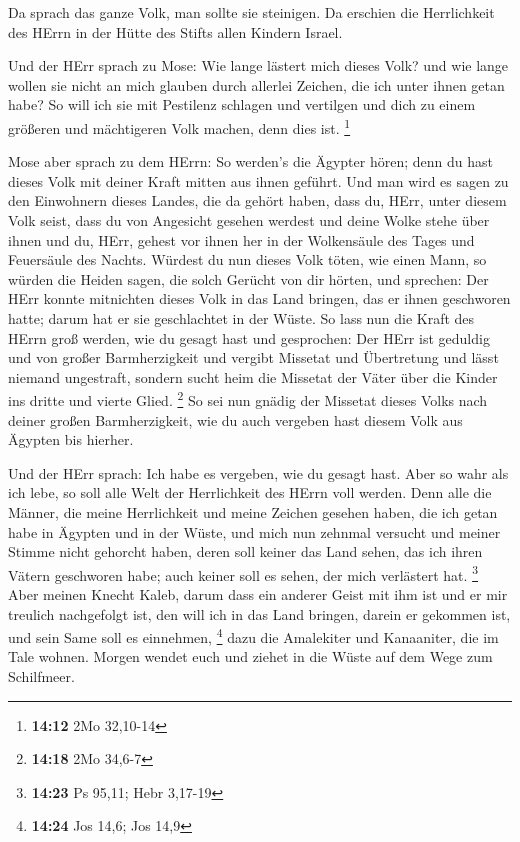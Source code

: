  Da sprach das ganze Volk, man sollte sie steinigen. Da
erschien die Herrlichkeit des HErrn in der Hütte des Stifts allen
Kindern Israel.

 Und der HErr sprach zu Mose: Wie lange lästert mich
dieses Volk? und wie lange wollen sie nicht an mich glauben durch
allerlei Zeichen, die ich unter ihnen getan habe?  So
will ich sie mit Pestilenz schlagen und vertilgen und dich zu einem
größeren und mächtigeren Volk machen, denn dies ist. \footnote{\textbf{14:12}
  2Mo 32,10-14}

 Mose aber sprach zu dem HErrn: So werden's die Ägypter
hören; denn du hast dieses Volk mit deiner Kraft mitten aus ihnen
geführt.  Und man wird es sagen zu den Einwohnern dieses
Landes, die da gehört haben, dass du, HErr, unter diesem Volk seist,
dass du von Angesicht gesehen werdest und deine Wolke stehe über ihnen
und du, HErr, gehest vor ihnen her in der Wolkensäule des Tages und
Feuersäule des Nachts.  Würdest du nun dieses Volk töten,
wie einen Mann, so würden die Heiden sagen, die solch Gerücht von dir
hörten, und sprechen:  Der HErr konnte mitnichten dieses
Volk in das Land bringen, das er ihnen geschworen hatte; darum hat er
sie geschlachtet in der Wüste.  So lass nun die Kraft des
HErrn groß werden, wie du gesagt hast und gesprochen: 
Der HErr ist geduldig und von großer Barmherzigkeit und vergibt Missetat
und Übertretung und lässt niemand ungestraft, sondern sucht heim die
Missetat der Väter über die Kinder ins dritte und vierte Glied.
\footnote{\textbf{14:18} 2Mo 34,6-7}  So sei nun gnädig
der Missetat dieses Volks nach deiner großen Barmherzigkeit, wie du auch
vergeben hast diesem Volk aus Ägypten bis hierher.

 Und der HErr sprach: Ich habe es vergeben, wie du gesagt
hast.  Aber so wahr als ich lebe, so soll alle Welt der
Herrlichkeit des HErrn voll werden.  Denn alle die
Männer, die meine Herrlichkeit und meine Zeichen gesehen haben, die ich
getan habe in Ägypten und in der Wüste, und mich nun zehnmal versucht
und meiner Stimme nicht gehorcht haben,  deren soll
keiner das Land sehen, das ich ihren Vätern geschworen habe; auch keiner
soll es sehen, der mich verlästert hat. \footnote{\textbf{14:23} Ps
  95,11; Hebr 3,17-19}  Aber meinen Knecht Kaleb, darum
dass ein anderer Geist mit ihm ist und er mir treulich nachgefolgt ist,
den will ich in das Land bringen, darein er gekommen ist, und sein Same
soll es einnehmen, \footnote{\textbf{14:24} Jos 14,6; Jos 14,9}
 dazu die Amalekiter und Kanaaniter, die im Tale wohnen.
Morgen wendet euch und ziehet in die Wüste auf dem Wege zum Schilfmeer.

